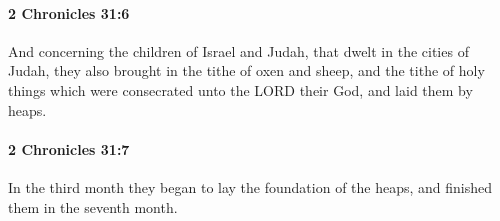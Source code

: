 		\paragraph{2 Chronicles 31:6} %
			\label{2CHRONICLES-31-6}

			And concerning the children of Israel and Judah, that dwelt in the cities of Judah, they also brought in the tithe of oxen and sheep, and the tithe of holy things which were consecrated unto the LORD their God, and laid them by heaps.


		\paragraph{2 Chronicles 31:7} %
			\label{2CHRONICLES-31-7}

			In the third month they began to lay the foundation of the heaps, and finished them in the seventh month.


